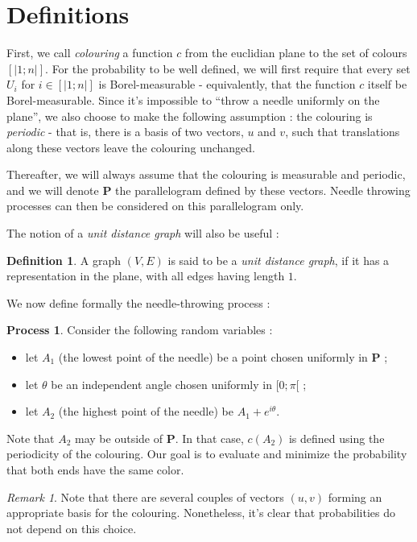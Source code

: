 \documentclass[a4paper,11pt]{article}
\theoremstyle{definition}
\newtheorem{definition}{Definition}
\newtheorem{process}{Process}
\theoremstyle{remark}
\newtheorem{remark}{Remark}
\begin{document}
\section{Definitions}
\label{def}
First, we call \emph{colouring} a function $c$ from the euclidian plane to the 
set of colours $[| 1 ; n |]$. For the probability to be well defined, we will 
first require that every set $U_i$ for $i \in [| 1 ; n |]$ is Borel-measurable 
- equivalently, that the function $c$ itself be Borel-measurable. Since it's 
impossible to ``throw a needle uniformly on the plane'', we also choose to make 
the following assumption : 
the colouring is \textit{periodic} - that is, there is a basis of two vectors, 
$u$ and $v$, such that translations along these vectors leave the colouring 
unchanged.

Thereafter, we will always assume that the colouring is measurable and 
periodic, and we will denote $\mathbf{P}$ the parallelogram defined by these 
vectors. Needle throwing processes can then be considered on this parallelogram only.

The notion of a \emph{unit distance graph} will also be useful :
\begin{definition}

A graph $(V,E) $ is said to be a \emph{unit distance graph}, if it has a 
representation in the plane, with all edges having length $1$.
\end{definition}

We now define formally the needle-throwing process :
\begin{process}
Consider the following random variables :
\begin{itemize}
  \item let $A_1$ (the lowest point of the needle) be a point chosen uniformly 
  in $\mathbf{P}$ ;
  \item let $\theta$ be an independent angle chosen uniformly in $[0;\pi[$ ;
  \item let $A_2$ (the highest point of the needle) be $A_1 + e^{i \theta}$.
\end{itemize}
\end{process}

Note that $A_2$ may be outside of $\mathbf{P}$. In that case, $c(A_2)$ is 
defined using the periodicity of the colouring.
Our goal is to evaluate and minimize the probability that both ends have the 
same color.

\begin{remark}
Note that there are several couples of vectors $(u,v)$ forming an appropriate 
basis for the colouring. Nonetheless, it's clear that probabilities do not 
depend on this choice. 
\end{remark}
\end{document}

